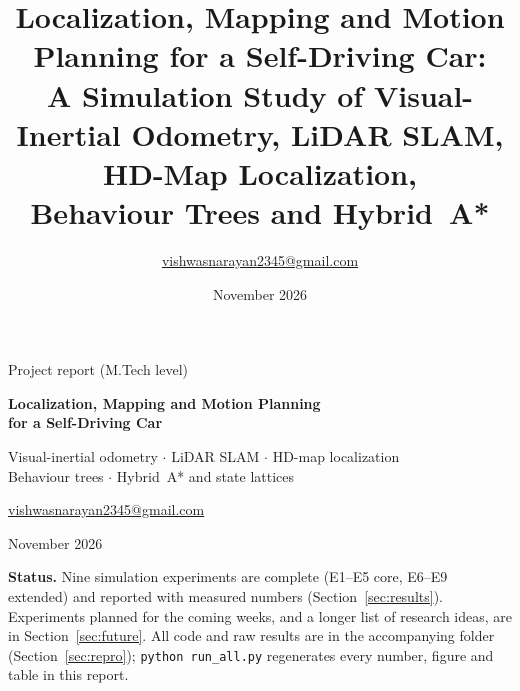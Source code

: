 \documentclass[11pt,a4paper]{article}
\title{Localization, Mapping and Motion Planning for a Self-Driving Car:\\[2pt]
\large A Simulation Study of Visual-Inertial Odometry, LiDAR SLAM, HD-Map Localization,\\ Behaviour Trees and Hybrid~A*}
\author{\href{mailto:vishwasnarayan2345@gmail.com}{vishwasnarayan2345@gmail.com}}
\date{November 2026}
\begin{document}
\begin{titlepage}
\centering\vspace*{2.2cm}
{\large Project report (M.Tech level)\par}\vspace{1.4cm}
{\Large\bfseries Localization, Mapping and Motion Planning\\ for a Self-Driving Car\par}\vspace{0.5cm}
{\large Visual-inertial odometry $\cdot$ LiDAR SLAM $\cdot$ HD-map localization\\ Behaviour trees $\cdot$ Hybrid~A* and state lattices\par}\vspace{1.6cm}
{\large\href{mailto:vishwasnarayan2345@gmail.com}{vishwasnarayan2345@gmail.com}\par}\vspace{0.4cm}
{\large November 2026\par}\vfill
\begin{minipage}{0.85\linewidth}\small\noindent
\textbf{Status.} Nine simulation experiments are complete (E1--E5 core, E6--E9 extended) and reported with measured numbers (Section~\ref{sec:results}). Experiments planned for the coming weeks, and a longer list of research ideas, are in Section~\ref{sec:future}. All code and raw results are in the accompanying folder (Section~\ref{sec:repro}); \texttt{python run\_all.py} regenerates every number, figure and table in this report.
\end{minipage}\vspace{1.5cm}
\end{titlepage}
\end{document}
